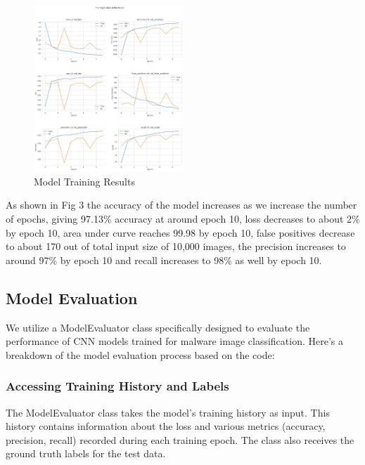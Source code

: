 \documentclass[conference]{IEEEtran}
\begin{document}
\begin{figure}[ht] %
        \centering %
        \includegraphics[width=0.5\textwidth]{training history.jpeg} %
        \caption{Model Training Results} %
        \label{fig:example5} %
      \end{figure}
       
      As shown in Fig 3 the accuracy of the model increases as we increase the number of epochs, giving 97.13\% accuracy at around epoch 10, loss decreases to about 2\% by epoch 10, area under curve reaches 99.98 by epoch 10, false positives decrease to about 170 out of total input size of 10,000 images, the precision increases to around 97\% by epoch 10 and recall increases to 98\% as well by epoch 10.
\subsection{Model Evaluation}
We utilize a ModelEvaluator class specifically designed to evaluate the performance of CNN models trained for malware image classification. Here's a breakdown of the model evaluation process based on the code:

\subsubsection{Accessing Training History and Labels}

    The ModelEvaluator class  takes the model's training history as input. This history contains information about the loss and various metrics (accuracy, precision, recall) recorded during each training epoch.
    The class also receives the ground truth labels for the test data.
\end{document}
